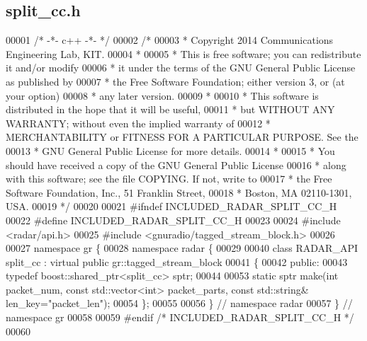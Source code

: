 \subsection{split\+\_\+cc.\+h}
\label{split__cc_8h_source}

\begin{DoxyCode}
00001 \textcolor{comment}{/* -*- c++ -*- */}
00002 \textcolor{comment}{/* }
00003 \textcolor{comment}{ * Copyright 2014 Communications Engineering Lab, KIT.}
00004 \textcolor{comment}{ * }
00005 \textcolor{comment}{ * This is free software; you can redistribute it and/or modify}
00006 \textcolor{comment}{ * it under the terms of the GNU General Public License as published by}
00007 \textcolor{comment}{ * the Free Software Foundation; either version 3, or (at your option)}
00008 \textcolor{comment}{ * any later version.}
00009 \textcolor{comment}{ * }
00010 \textcolor{comment}{ * This software is distributed in the hope that it will be useful,}
00011 \textcolor{comment}{ * but WITHOUT ANY WARRANTY; without even the implied warranty of}
00012 \textcolor{comment}{ * MERCHANTABILITY or FITNESS FOR A PARTICULAR PURPOSE.  See the}
00013 \textcolor{comment}{ * GNU General Public License for more details.}
00014 \textcolor{comment}{ * }
00015 \textcolor{comment}{ * You should have received a copy of the GNU General Public License}
00016 \textcolor{comment}{ * along with this software; see the file COPYING.  If not, write to}
00017 \textcolor{comment}{ * the Free Software Foundation, Inc., 51 Franklin Street,}
00018 \textcolor{comment}{ * Boston, MA 02110-1301, USA.}
00019 \textcolor{comment}{ */}
00020 
00021 \textcolor{preprocessor}{#ifndef INCLUDED\_RADAR\_SPLIT\_CC\_H}
00022 \textcolor{preprocessor}{#define INCLUDED\_RADAR\_SPLIT\_CC\_H}
00023 
00024 \textcolor{preprocessor}{#include <radar/api.h>}
00025 \textcolor{preprocessor}{#include <gnuradio/tagged\_stream\_block.h>}
00026 
00027 \textcolor{keyword}{namespace }gr \{
00028   \textcolor{keyword}{namespace }radar \{
00029 
00040     \textcolor{keyword}{class }RADAR_API split_cc : \textcolor{keyword}{virtual} \textcolor{keyword}{public} gr::tagged\_stream\_block
00041     \{
00042      \textcolor{keyword}{public}:
00043       \textcolor{keyword}{typedef} boost::shared\_ptr<split\_cc> sptr;
00044 
00053       \textcolor{keyword}{static} sptr make(\textcolor{keywordtype}{int} packet\_num, \textcolor{keyword}{const} std::vector<int> packet\_parts, \textcolor{keyword}{const} 
      std::string& len\_key=\textcolor{stringliteral}{"packet\_len"});
00054     \};
00055 
00056   \} \textcolor{comment}{// namespace radar}
00057 \} \textcolor{comment}{// namespace gr}
00058 
00059 \textcolor{preprocessor}{#endif }\textcolor{comment}{/* INCLUDED\_RADAR\_SPLIT\_CC\_H */}\textcolor{preprocessor}{}
00060 
\end{DoxyCode}
